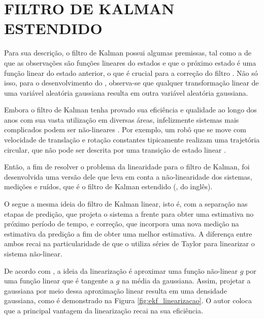 \documentclass[acronym, symbols, table]{fei}
\begin{document}
		\section{FILTRO DE KALMAN ESTENDIDO}
			
			Para sua descrição, o filtro de Kalman possui algumas premissas, tal como a de que as observações são funções lineares do estados e que o próximo estado é uma função linear do estado anterior, o que é crucial para a correção do filtro \cite{thrun2002probabilistic}. Não só isso, para o desenvolvimento do , observa-se que qualquer transformação linear de uma variável aleatória gaussiana resulta em outra variável aleatória gaussiana. 
			
			Embora o filtro de Kalman tenha provado sua eficiência e qualidade ao longo dos anos com sua vasta utilização em diversas áreas, infelizmente sistemas mais complicados podem ser não-lineares \cite{khodarahmi2023review}. Por exemplo, um robô que se move com velocidade de translação e rotação constantes tipicamente realizam uma trajetória circular, que não pode ser descrita por uma transição de estado linear \cite{thrun2002probabilistic}.
			
			Então, a fim de resolver o problema da linearidade para o filtro de Kalman, foi desenvolvida uma versão dele que leva em conta a não-linearidade dos sistemas, medições e ruídos, que é o filtro de Kalman estendido (, do inglês).
			
			O  segue a mesma ideia do filtro de Kalman linear, isto é, com a separação nas etapas de predição, que projeta o sistema a frente para obter uma estimativa no próximo período de tempo, e correção, que incorpora uma nova medição na estimativa da predição a fim de obter uma melhor estimativa. A diferença entre ambos recai na particularidade de que o  utiliza séries de Taylor para linearizar o sistema não-linear.
			
			De acordo com \textcite{thrun2002probabilistic}, a ideia da linearização é aproximar uma função não-linear $g$ por uma função linear que é tangente a $g$ na média da gaussiana. Assim, projetar a gaussiana por meio dessa aproximação linear resulta em uma densidade gaussiana, como é demonstrado na Figura \ref{fig:ekf_linearizacao}. O autor coloca que a principal vantagem da linearização recai na sua eficiência.
			
\end{document}
